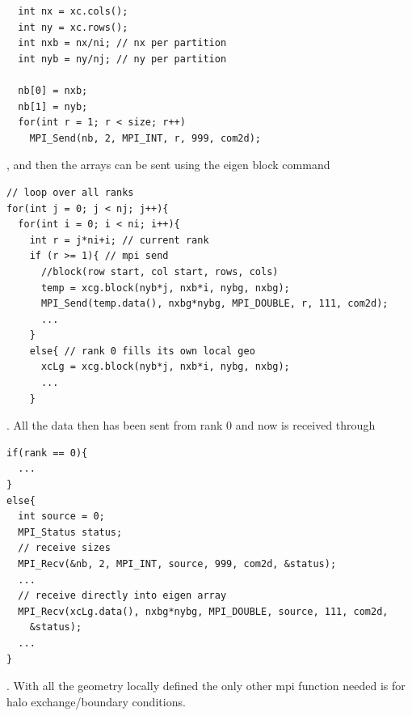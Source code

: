 \documentclass[paper=a4, fontsize=11pt]{scrartcl}
\numberwithin{equation}{section}                %
\numberwithin{figure}{section}                  %
\numberwithin{table}{section}                           %
\begin{document}
\begin{verbatim}
  int nx = xc.cols();
  int ny = xc.rows(); 
  int nxb = nx/ni; // nx per partition
  int nyb = ny/nj; // ny per partition
  
  nb[0] = nxb;
  nb[1] = nyb;
  for(int r = 1; r < size; r++)
    MPI_Send(nb, 2, MPI_INT, r, 999, com2d);
\end{verbatim}
, and then the arrays can be sent using the eigen block command 
\begin{verbatim}
// loop over all ranks
for(int j = 0; j < nj; j++){
  for(int i = 0; i < ni; i++){
    int r = j*ni+i; // current rank
    if (r >= 1){ // mpi send
      //block(row start, col start, rows, cols)
      temp = xcg.block(nyb*j, nxb*i, nybg, nxbg); 
      MPI_Send(temp.data(), nxbg*nybg, MPI_DOUBLE, r, 111, com2d);
      ...
    }
    else{ // rank 0 fills its own local geo
      xcLg = xcg.block(nyb*j, nxb*i, nybg, nxbg);
      ...
    } 
\end{verbatim}
. All the data then has been sent from rank 0 and now is received through

\begin{verbatim}
if(rank == 0){
  ...
}
else{
  int source = 0;
  MPI_Status status;
  // receive sizes
  MPI_Recv(&nb, 2, MPI_INT, source, 999, com2d, &status); 
  ...
  // receive directly into eigen array
  MPI_Recv(xcLg.data(), nxbg*nybg, MPI_DOUBLE, source, 111, com2d, 
    &status);
  ...
}
\end{verbatim}
. With all the geometry locally defined the only other mpi function needed is for halo exchange/boundary conditions. 
\end{document}
